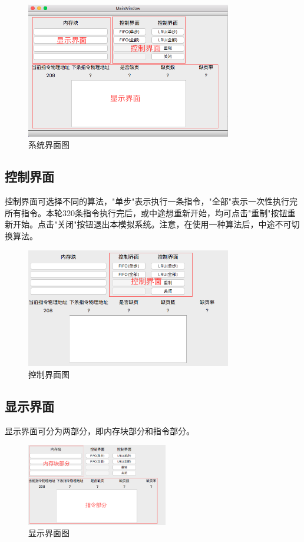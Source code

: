 \documentclass{article}
\begin{document}
\begin{CJK}{UTF8}{gbsn}
\begin{figure}[!h]
\centering
\includegraphics[width=0.8\textwidth]{3.png}
\caption{系统界面图}
\end{figure}

\subsection{控制界面}
控制界面可选择不同的算法，"单步"表示执行一条指令，"全部"表示一次性执行完所有指令。本轮320条指令执行完后，或中途想重新开始，均可点击"重制"按钮重新开始。点击"关闭"按钮退出本模拟系统。注意，在使用一种算法后，中途不可切换算法。
\begin{figure}[!h]
\centering
\includegraphics[width=0.8\textwidth]{4.png}
\caption{控制界面图}
\end{figure}

\clearpage
\subsection{显示界面}
显示界面可分为两部分，即内存块部分和指令部分。
\begin{figure}[!h]
\centering
\includegraphics[width=0.55\textwidth]{5.png}
\caption{显示界面图}
\end{figure}


\end{CJK}
\end{document}
